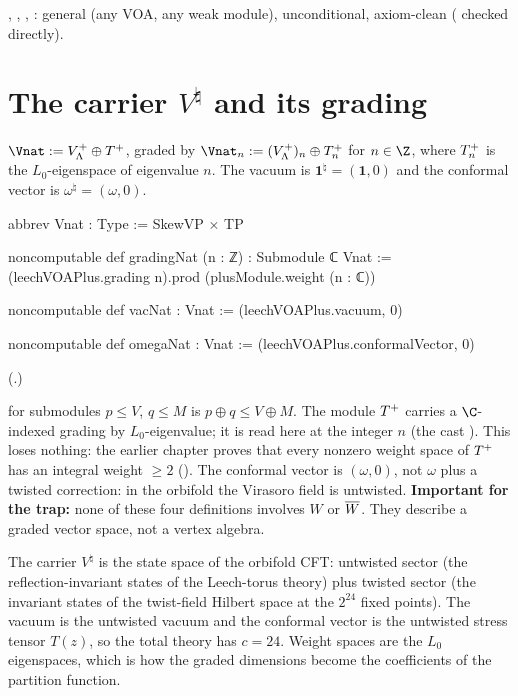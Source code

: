 \begin{status}
, , , : general (any VOA, any
weak module), unconditional, axiom-clean ( checked directly).
\end{status}

\section{The carrier \texorpdfstring{$V^\natural$}{V natural} and its grading}\label{ch10:sec:carrier}

\begin{definition}\label{ch10:def:vnat}
$\Vnat:=\chtenVP\oplus\chtenTP$, graded by $\Vnat_n:=(\chtenVP)_n\oplus\chtenTP_n$ for $n\in\Z$,
where $T^{+}_n$ is the $L_0$-eigenspace of eigenvalue $n$.  The vacuum is
$\mathbf1^\natural=(\mathbf1,0)$ and the conformal vector is $\omega^\natural=(\omega,0)$.
\end{definition}
\begin{leancode}
abbrev Vnat : Type := SkewVP × TP

noncomputable def gradingNat (n : ℤ) : Submodule ℂ Vnat :=
  (leechVOAPlus.grading n).prod (plusModule.weight (n : ℂ))

noncomputable def vacNat : Vnat := (leechVOAPlus.vacuum, 0)

noncomputable def omegaNat : Vnat := (leechVOAPlus.conformalVector, 0)
\end{leancode}
(.)
\begin{dictionary}
 for submodules $p\le V$, $q\le M$ is $p\oplus q\le V\oplus M$.  The module
$T^{+}$ carries a $\C$-indexed grading  by $L_0$-eigenvalue; it is read
here at the integer $n$ (the cast ).  This loses nothing: the earlier chapter proves
that every nonzero weight space of $T^{+}$ has an integral weight $\ge2$
().  The conformal vector is $(\omega,0)$, not $\omega$ plus a
twisted correction: in the orbifold the Virasoro field is untwisted.  \textbf{Important for the
trap:} none of these four definitions involves $W$ or $\overline{W}$.  They describe a graded vector
space, not a vertex algebra.
\end{dictionary}

\begin{physics}
The carrier $V^\natural$ is the state space of the orbifold CFT: untwisted sector (the reflection-invariant states of the Leech-torus theory) plus twisted sector (the invariant states of the twist-field Hilbert space at the $2^{24}$ fixed points). The vacuum is the untwisted vacuum and the conformal vector is the untwisted stress tensor $T(z)$, so the total theory has $c=24$. Weight spaces are the $L_0$ eigenspaces, which is how the graded dimensions become the coefficients of the partition function.
\end{physics}

